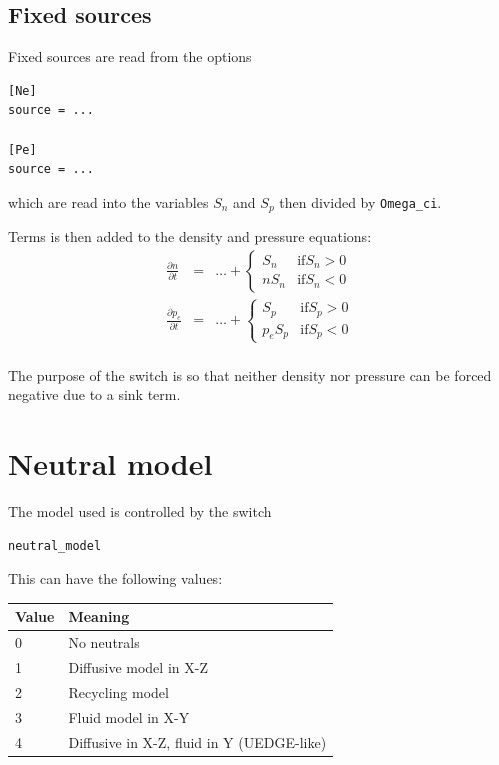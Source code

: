 \documentclass[12pt,a4paper]{article}
\begin{document}
\subsection{Fixed sources}

Fixed sources are read from the options
\begin{verbatim}
[Ne]
source = ...

[Pe]
source = ...
\end{verbatim}
which are read into the variables $S_n$ and $S_p$ then divided by \texttt{Omega\_ci}.

Terms is then added to the density and pressure equations:
\begin{eqnarray}
  \frac{\partial n}{\partial t} &=& \ldots + \left\{\begin{array}{cc}
  S_n & \mathrm{if} S_n > 0 \\
  n S_n & \mathrm{if} S_n < 0
  \end{array}\right. \\
  \frac{\partial p_e}{\partial t} &=& \ldots + \left\{\begin{array}{cc}
  S_p & \mathrm{if} S_p > 0 \\
  p_e S_p & \mathrm{if} S_p < 0
  \end{array}\right. \\
\end{eqnarray}

The purpose of the switch is so that neither density nor pressure can be forced negative due to a sink term.



\section{Neutral model}
\label{sec:neutrals}

The model used is controlled by the switch

\begin{verbatim}
neutral_model
\end{verbatim}

This can have the following values:

\begin{tabular}{ll}
Value & Meaning \\
\hline
\hline
0 & No neutrals \\
1 & Diffusive model in X-Z \\
2 & Recycling model \\
3 & Fluid model in X-Y \\
4 & Diffusive in X-Z, fluid in Y (UEDGE-like) \\
\hline
\hline
\end{tabular}
\end{document}
